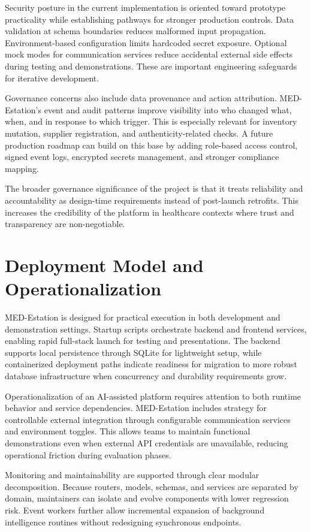 \documentclass[12pt,a4paper]{report}
\begin{document}
Security posture in the current implementation is oriented toward prototype practicality while establishing pathways for stronger production controls. Data validation at schema boundaries reduces malformed input propagation. Environment-based configuration limits hardcoded secret exposure. Optional mock modes for communication services reduce accidental external side effects during testing and demonstrations. These are important engineering safeguards for iterative development.

Governance concerns also include data provenance and action attribution. MED-Estation’s event and audit patterns improve visibility into who changed what, when, and in response to which trigger. This is especially relevant for inventory mutation, supplier registration, and authenticity-related checks. A future production roadmap can build on this base by adding role-based access control, signed event logs, encrypted secrets management, and stronger compliance mapping.

The broader governance significance of the project is that it treats reliability and accountability as design-time requirements instead of post-launch retrofits. This increases the credibility of the platform in healthcare contexts where trust and transparency are non-negotiable.

\chapter{Deployment Model and Operationalization}
MED-Estation is designed for practical execution in both development and demonstration settings. Startup scripts orchestrate backend and frontend services, enabling rapid full-stack launch for testing and presentations. The backend supports local persistence through SQLite for lightweight setup, while containerized deployment paths indicate readiness for migration to more robust database infrastructure when concurrency and durability requirements grow.

Operationalization of an AI-assisted platform requires attention to both runtime behavior and service dependencies. MED-Estation includes strategy for controllable external integration through configurable communication services and environment toggles. This allows teams to maintain functional demonstrations even when external API credentials are unavailable, reducing operational friction during evaluation phases.

Monitoring and maintainability are supported through clear modular decomposition. Because routers, models, schemas, and services are separated by domain, maintainers can isolate and evolve components with lower regression risk. Event workers further allow incremental expansion of background intelligence routines without redesigning synchronous endpoints.
\end{document}
